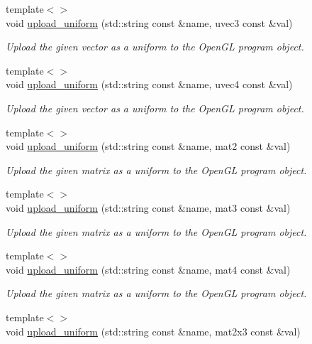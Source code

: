 \begin{DoxyCompactItemize}
{\footnotesize template$<$$>$ }\\void \hyperlink{classgfx_1_1program_a1a68c40e30f4c00639df2ce60eba6b80}{upload\-\_\-uniform} (std\-::string const \&name, uvec3 const \&val)
\begin{DoxyCompactList}\small\item\em Upload the given vector as a uniform to the Open\-G\-L program object. \end{DoxyCompactList}\item 
{\footnotesize template$<$$>$ }\\void \hyperlink{classgfx_1_1program_a2492cfa836006650d5de5c4a03b581b5}{upload\-\_\-uniform} (std\-::string const \&name, uvec4 const \&val)
\begin{DoxyCompactList}\small\item\em Upload the given vector as a uniform to the Open\-G\-L program object. \end{DoxyCompactList}\item 
{\footnotesize template$<$$>$ }\\void \hyperlink{classgfx_1_1program_ad7d4c6f5074ef425bd45ee71a74c1cd4}{upload\-\_\-uniform} (std\-::string const \&name, mat2 const \&val)
\begin{DoxyCompactList}\small\item\em Upload the given matrix as a uniform to the Open\-G\-L program object. \end{DoxyCompactList}\item 
{\footnotesize template$<$$>$ }\\void \hyperlink{classgfx_1_1program_ac85d00fb59623952cfec499ef34ae2e8}{upload\-\_\-uniform} (std\-::string const \&name, mat3 const \&val)
\begin{DoxyCompactList}\small\item\em Upload the given matrix as a uniform to the Open\-G\-L program object. \end{DoxyCompactList}\item 
{\footnotesize template$<$$>$ }\\void \hyperlink{classgfx_1_1program_a0845dc608fa61dfee3c5973d73bc26e5}{upload\-\_\-uniform} (std\-::string const \&name, mat4 const \&val)
\begin{DoxyCompactList}\small\item\em Upload the given matrix as a uniform to the Open\-G\-L program object. \end{DoxyCompactList}\item 
{\footnotesize template$<$$>$ }\\void \hyperlink{classgfx_1_1program_a88bb45b2e2cffe102eb0f567760a3d01}{upload\-\_\-uniform} (std\-::string const \&name, mat2x3 const \&val)

\end{DoxyCompactItemize}
